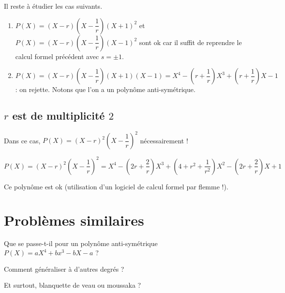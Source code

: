 \documentclass[12pt]{amsart}
\begin{document}
Il reste à étudier les cas suivants.

\begin{enumerate}
	\item $P(X) = (X - r) \left( X - \dfrac1r \right) (X + 1)^2$ et $P(X) = (X - r) \left( X - \dfrac1r \right) (X - 1)^2$ sont ok car il suffit de reprendre le calcul formel précédent avec $s = \pm 1$.
	

	\item $P(X) = (X - r) \left( X - \dfrac1r \right) (X + 1) (X - 1)
	            = X^4
	            - \left( r + \dfrac1r \right) X^3 
	            + \left( r + \dfrac1r \right) X
	            - 1$ : on rejette. Notons que l'on a un polynôme anti-symétrique.
\end{enumerate}


\subsection*{$r$ est de multiplicité $2$}

Dans ce cas, $P(X) = (X - r)^2 \left( X - \dfrac1r \right)^2$ nécessairement !


$P(X) = (X - r)^2 \left( X - \dfrac1r \right)^2 
      = X^4
      - \left( 2 r + \dfrac2r \right) X^3 
      + \left( 4 + r^2 + \dfrac{1}{r^2} \right) X^2 
      - \left( 2 r + \dfrac2r \right) X
      + 1$
      
Ce polynôme est ok (utilisation d'un logiciel de calcul formel par flemme !).



\section{Problèmes similaires}

Que se passe-t-il pour un polynôme anti-symétrique $P(X) = a X^4 + b x^3 - b X - a$ ?

\medskip

Comment généraliser à d'autres degrés ?

\medskip

Et surtout, blanquette de veau ou moussaka ?
\end{document}
